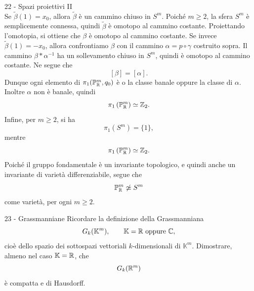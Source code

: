 \documentclass[a4paper]{article}
\begin{document}
\begin{snippetsolution}{22 - Spazi proiettivi II}
\[    \]
    Se \(\widetilde{\beta}(1)=x_0\), allora \(\widetilde{\beta}\) è un cammino chiuso in \(S^m\). Poiché \(m\geq2\), la sfera \(S^m\) è semplicemente connessa, quindi \(\widetilde{\beta}\) è omotopo al cammino costante. Proiettando l'omotopia, si ottiene che \(\beta\) è omotopo al cammino costante.
    Se invece \(\widetilde{\beta}(1)=-x_0\), allora confrontiamo \(\beta\) con il cammino \(\alpha=p\circ\gamma\) costruito sopra. Il cammino \(\beta*\alpha^{-1}\) ha un sollevamento chiuso in \(S^m\), quindi è omotopo al cammino costante. Ne segue che
    \[
        [\beta]=[\alpha].
    \]
    Dunque ogni elemento di \(\pi_1(\mathbb{P}^m_{\mathbb{R}},q_0)\) è o la classe banale oppure la classe di \(\alpha\). Inoltre \(\alpha\) non è banale, quindi
    \[
        \pi_1\left(\mathbb{P}^m_{\mathbb{R}}\right)\simeq\mathbb{Z}_2.
    \]
    Infine, per \(m\geq2\), si ha
    \[
        \pi_1(S^m)=\{1\},
    \]
    mentre
    \[
        \pi_1\left(\mathbb{P}^m_{\mathbb{R}}\right)\simeq\mathbb{Z}_2.
    \]
    Poiché il gruppo fondamentale è un invariante topologico, e quindi anche un invariante di varietà differenziabile, segue che
    \[
        \mathbb{P}^m_{\mathbb{R}}\not\simeq S^m
    \]
    come varietà, per ogni \(m\geq2\).
\end{snippetsolution}

\begin{snippetexercise}{23 - Grassmanniane}
    Ricordare la definizione della Grassmanniana
    \[
        G_k(\mathbb{K}^m),
        \qquad
        \mathbb{K}=\mathbb{R} \text{ oppure } \mathbb{C},
    \]
    cioè dello spazio dei sottospazi vettoriali \(k\)-dimensionali di
    \(\mathbb{K}^m\). Dimostrare, almeno nel caso
    \(\mathbb{K}=\mathbb{R}\), che
    \[
        G_k(\mathbb{R}^m)
    \]
    è compatta e di Hausdorff.
\end{snippetexercise}
\end{document}
